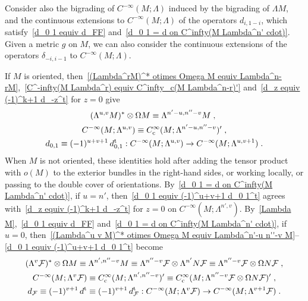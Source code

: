 \documentclass{memo-l}
\theoremstyle{plain}
\theoremstyle{definition}
\theoremstyle{remark}
\newcommand{\FF}{\mathcal{F}}
\newcommand{\trans}{{\text{\rm t}}}
\newcommand{\Cinftyc}{C^\infty_{\text{\rm c}}}
\numberwithin{section}{chapter}
\numberwithin{equation}{section}%
\begin{document}
Consider also the bigrading of $C^{-\infty}(M;\Lambda)$ induced by the bigrading of $\Lambda M$, and the continuous extensions to $C^{-\infty}(M;\Lambda)$ of the operators $d_{i,1-i}$, which satisfy~\eqref{d_0 1 equiv d_FF} and~\eqref{d_0 1 = d on C^infty(M Lambda^n' cdot)}. Given a metric $g$ on $M$, we can also consider the continuous extensions of the operators $\delta_{-i,i-1}$ to $C^{-\infty}(M;\Lambda)$.

If $M$ is oriented, then~\eqref{(Lambda^rM)^* otimes Omega M equiv Lambda^n-rM},~\eqref{C^-infty(M Lambda^r) equiv C^infty_c(M Lambda^n-r)'} and~\eqref{d_z equiv (-1)^k+1 d_-z^t} for $z=0$ give
\begin{gather}
(\Lambda^{u,v}M)^*\otimes\Omega M\equiv\Lambda^{n'-u,n''-v}M\;,\
\label{(Lambda^u v M)^* otimes Omega M equiv Lambda^n'-u n''-v M}\\
C^{-\infty}(M;\Lambda^{u,v})\equiv\Cinftyc(M;\Lambda^{n'-u,n''-v})'\;,
\label{C^-infty(M Lambda^u v) equiv C^infty_c(M Lambda^n'-u n''-v)'}\\
d_{0,1}\equiv(-1)^{u+v+1}\,d_{0,1}^\trans:C^{-\infty}(M;\Lambda^{u,v})\to C^{-\infty}(M;\Lambda^{u,v+1})\;. 
\label{d_0 1 equiv (-1)^u+v+1 d_0 1^t}
\end{gather}
When $M$ is not oriented, these identities hold after adding the tensor product with $o(M)$ to the exterior bundles in the right-hand sides, or working locally, or passing to the double cover of orientations. By~\eqref{d_0 1 = d on C^infty(M Lambda^n' cdot)}, if $u=n'$, then~\eqref{d_0 1 equiv (-1)^u+v+1 d_0 1^t} agrees with~\eqref{d_z equiv (-1)^k+1 d_-z^t} for $z=0$ on $C^{-\infty}(M;\Lambda^{n',v})$. By~\eqref{Lambda M},~\eqref{d_0 1 equiv d_FF} and~\eqref{d_0 1 = d on C^infty(M Lambda^n' cdot)}, if $u=0$, then~\eqref{(Lambda^u v M)^* otimes Omega M equiv Lambda^n'-u n''-v M}--\eqref{d_0 1 equiv (-1)^u+v+1 d_0 1^t} become
\begin{gather}
(\Lambda^v\FF)^*\otimes\Omega M\equiv\Lambda^{n',n''-v}M\equiv\Lambda^{n''-v}\FF\otimes\Lambda^{n'}N\FF
\equiv\Lambda^{n''-v}\FF\otimes\Omega N\FF\;,
\label{(Lambda^v FF)^* otimes Omega M equiv Lambda^n' n''-v M}\\
C^{-\infty}(M;\Lambda^v\FF)\equiv\Cinftyc(M;\Lambda^{n',n''-v})'
\equiv\Cinftyc(M;\Lambda^{n''-v}\FF\otimes\Omega N\FF)'\;,
\label{C^-infty(M Lambda^v FF) equiv C^infty_c(M Lambda^n''-v FF otimes Omega N FF)'}\\
d_\FF\equiv(-1)^{v+1}\,d^\trans\equiv(-1)^{v+1}\,d_\FF^\trans:
C^{-\infty}(M;\Lambda^v\FF)\to C^{-\infty}(M;\Lambda^{v+1}\FF)\;. 
\label{d_FF equiv (-1)^v+1 d_FF^t}
\end{gather}
\end{document}
